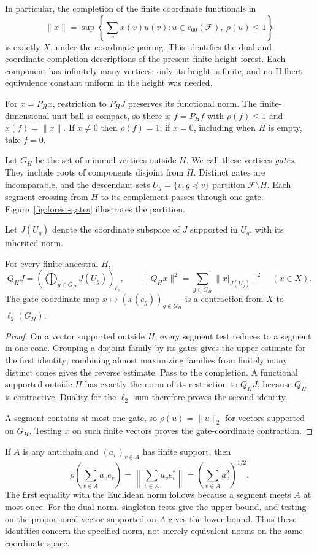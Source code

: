In particular, the completion of the finite coordinate functionals in
\[
 \|x\|=\sup\left\{\sum_vx(v)u(v):u\in c_{00}(\mathcal F),\ \rho(u)\le1\right\}
\]
is exactly $X$, under the coordinate pairing. This identifies the dual
and coordinate-completion descriptions of the present finite-height
forest. Each component has infinitely many vertices; only its height
is finite, and no Hilbert equivalence constant uniform in the height
was needed.

For $x=P_Hx$, restriction to $P_HJ$ preserves its functional norm.
The finite-dimensional unit ball is compact, so there is $f=P_Hf$
with $\rho(f)\le1$ and $x(f)=\|x\|$. If $x\ne0$ then $\rho(f)=1$;
if $x=0$, including when $H$ is empty, take $f=0$.


Let $G_H$ be the set of minimal vertices outside $H$. We call these
vertices \emph{gates}. They include roots of components disjoint from
$H$. Distinct gates are incomparable, and the descendant sets
$U_g=\{v:g\preceq v\}$ partition $\mathcal F\setminus H$.
Each segment crossing from $H$ to its complement passes through one
gate. Figure~\ref{fig:forest-gates} illustrates the partition.

 Let $J(U_g)$ denote the coordinate subspace of $J$ supported in
$U_g$, with its inherited norm.

\begin{lemma}\label{lem:cones}
For every finite ancestral $H$,
\begin{equation}\label{eq:cone-decomposition}
 Q_HJ=\left(\bigoplus_{g\in G_H}J(U_g)\right)_{\ell_2},
 \qquad
 \|Q_Hx\|^2=\sum_{g\in G_H}\|x|_{J(U_g)}\|^2\quad(x\in X).
\end{equation}
The gate-coordinate map $x\mapsto(x(e_g))_{g\in G_H}$ is a contraction
from $X$ to $\ell_2(G_H)$.
\end{lemma}

\begin{proof}
On a vector supported outside $H$, every segment test reduces to a
segment in one cone. Grouping a disjoint family by its gates gives the
upper estimate for the first identity; combining almost maximizing
families from finitely many distinct cones gives the reverse estimate.
Pass to the completion. A functional supported outside $H$ has exactly
the norm of its restriction to $Q_HJ$, because $Q_H$ is contractive.
Duality for the $\ell_2$ sum therefore proves the second identity.

A segment contains at most one gate, so $\rho(u)=\|u\|_2$ for
vectors supported on $G_H$. Testing $x$ on such finite vectors proves
the gate-coordinate contraction.
\end{proof}

If $A$ is any antichain and $(a_v)_{v\in A}$ has finite support, then
\begin{equation}\label{eq:antichain-isometry}
 \rho\left(\sum_{v\in A}a_ve_v\right)
 =\left\|\sum_{v\in A}a_ve_v^*\right\|
 =\left(\sum_{v\in A}a_v^2\right)^{1/2}.
\end{equation}
The first equality with the Euclidean norm follows because a segment
meets $A$ at most once. For the dual norm, singleton tests give the upper
bound, and testing on the proportional vector supported on $A$ gives
the lower bound. Thus these identities concern the specified norm,
not merely equivalent norms on the same coordinate space.
